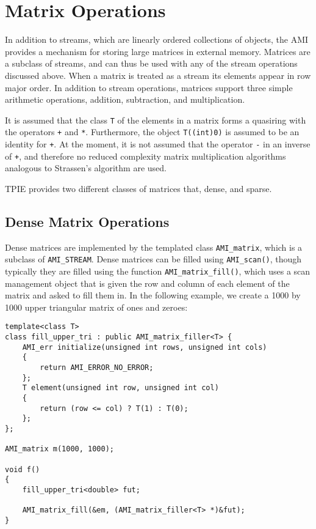 \tobewritten

\section{Matrix Operations}
\label{sec:matrix}



In addition to streams, which are linearly ordered collections of objects,
the AMI provides a mechanism for storing large matrices in external memory.
Matrices are a subclass of streams, and can thus be used with any of the
stream operations discussed above.  When a matrix is treated as a stream
its elements appear in row major order.  In addition to stream operations,
matrices support three simple arithmetic operations, addition, subtraction,
and multiplication.

It is assumed that the class \verb|T| of the elements in a matrix forms a
quasiring with the operators \verb|+| and \verb|*|.  Furthermore, the
object \verb|T((int)0)| is assumed to be an identity for \verb|+|.  At the
moment, it is not assumed that the operator
\verb|-| in an inverse of \verb|+|, and therefore no reduced
complexity matrix multiplication algorithms analogous to Strassen's
algorithm are used.

TPIE provides two different classes of matrices that, dense, and sparse.


\subsection{Dense Matrix Operations}
\label{sec:dense-mat}


Dense matrices are implemented by the templated class
\verb|AMI_matrix|, which is a subclass
of \verb|AMI_STREAM|. Dense matrices
can be filled using \verb|AMI_scan()|, though typically they are filled
using the function \verb|AMI_matrix_fill()|, which uses a scan management
object that is given the row and column of each element of the matrix and
asked to fill them in.  In the following example, we create a 1000 by 1000
upper triangular matrix of ones and zeroes:

\begin{verbatim}
template<class T>
class fill_upper_tri : public AMI_matrix_filler<T> {
    AMI_err initialize(unsigned int rows, unsigned int cols)
    {
        return AMI_ERROR_NO_ERROR;
    };
    T element(unsigned int row, unsigned int col)
    {
        return (row <= col) ? T(1) : T(0);
    };
};

AMI_matrix m(1000, 1000);

void f()
{
    fill_upper_tri<double> fut;

    AMI_matrix_fill(&em, (AMI_matrix_filler<T> *)&fut);
}
\end{verbatim}

